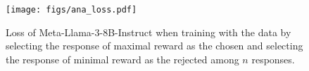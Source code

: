 \begin{figure}[!t]
\centering
    \begin{minipage}[c]{\linewidth}
        \centering
        \texttt{[image: figs/ana\_loss.pdf]}
    \end{minipage}
\caption{Loss of Meta-Llama-3-8B-Instruct when training with the data by selecting the response of maximal reward as the chosen and selecting the response of minimal reward as the rejected among $n$ responses.}
\label{ana_loss}
\end{figure}